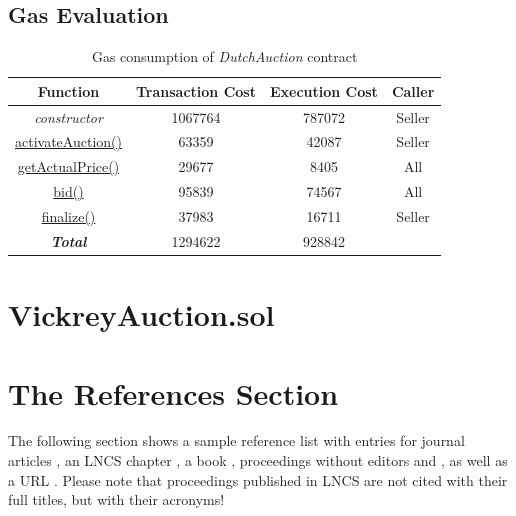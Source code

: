 \documentclass[runningheads,a4paper]{llncs}
\begin{document}
\subsection{Gas Evaluation}

\begin{table}
\setlength{\tabcolsep}{10pt}
\setlength{\abovecaptionskip}{10pt}
\centering
\begin{tabular}{| c | c | c | c |} 
 \hline
 \textbf{Function} & \textbf{Transaction Cost} & \textbf{Execution Cost} & \textbf{Caller} \\
 \hline
 \emph{constructor} & 1067764 & 787072 & Seller \\ 
 \hline
 \url{activateAuction()} & 63359 & 42087 & Seller \\ 
 \hline
 \url{getActualPrice()} & 29677 & 8405 & All \\ 
 \hline
 \url{bid()} & 95839 & 74567 & All \\ 
 \hline
 \url{finalize()} & 37983 & 16711 & Seller \\
 \hline
 \hline
 \hline
 \textbf{\emph{Total}} & 1294622 & 928842 & \\ \hline
\end{tabular}
\caption{Gas consumption of \emph{DutchAuction} contract}
\label{table:1}
\end{table}




\newpage
\section{VickreyAuction.sol}




\section{The References Section}\label{references}
The following section shows a sample reference list with entries for
journal articles \cite{jour}, an LNCS chapter \cite{lncschap}, a book
\cite{book}, proceedings without editors \cite{proceeding1} and
\cite{proceeding2}, as well as a URL \cite{ethBlog}.
Please note that proceedings published in LNCS are not cited with their
full titles, but with their acronyms!
\end{document}
